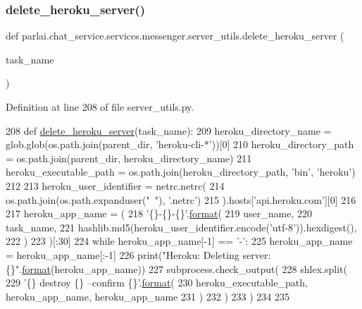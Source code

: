 \subsubsection{\texorpdfstring{delete\+\_\+heroku\+\_\+server()}{delete\_heroku\_server()}}
{\footnotesize\ttfamily def parlai.\+chat\+\_\+service.\+services.\+messenger.\+server\+\_\+utils.\+delete\+\_\+heroku\+\_\+server (\begin{DoxyParamCaption}\item[{}]{task\+\_\+name }\end{DoxyParamCaption})}



Definition at line 208 of file server\+\_\+utils.\+py.


\begin{DoxyCode}
208 \textcolor{keyword}{def }\hyperlink{namespaceparlai_1_1mturk_1_1core_1_1server__utils_a8dfde882f9d6ff492ca565ae2334fc70}{delete\_heroku\_server}(task\_name):
209     heroku\_directory\_name = glob.glob(os.path.join(parent\_dir, \textcolor{stringliteral}{'heroku-cli-*'}))[0]
210     heroku\_directory\_path = os.path.join(parent\_dir, heroku\_directory\_name)
211     heroku\_executable\_path = os.path.join(heroku\_directory\_path, \textcolor{stringliteral}{'bin'}, \textcolor{stringliteral}{'heroku'})
212 
213     heroku\_user\_identifier = netrc.netrc(
214         os.path.join(os.path.expanduser(\textcolor{stringliteral}{"~"}), \textcolor{stringliteral}{'.netrc'})
215     ).hosts[\textcolor{stringliteral}{'api.heroku.com'}][0]
216 
217     heroku\_app\_name = (
218         \textcolor{stringliteral}{'\{\}-\{\}-\{\}'}.\hyperlink{namespaceparlai_1_1chat__service_1_1services_1_1messenger_1_1shared__utils_a32e2e2022b824fbaf80c747160b52a76}{format}(
219             user\_name,
220             task\_name,
221             hashlib.md5(heroku\_user\_identifier.encode(\textcolor{stringliteral}{'utf-8'})).hexdigest(),
222         )
223     )[:30]
224     \textcolor{keywordflow}{while} heroku\_app\_name[-1] == \textcolor{stringliteral}{'-'}:
225         heroku\_app\_name = heroku\_app\_name[:-1]
226     print(\textcolor{stringliteral}{"Heroku: Deleting server: \{\}"}.\hyperlink{namespaceparlai_1_1chat__service_1_1services_1_1messenger_1_1shared__utils_a32e2e2022b824fbaf80c747160b52a76}{format}(heroku\_app\_name))
227     subprocess.check\_output(
228         shlex.split(
229             \textcolor{stringliteral}{'\{\} destroy \{\} --confirm \{\}'}.\hyperlink{namespaceparlai_1_1chat__service_1_1services_1_1messenger_1_1shared__utils_a32e2e2022b824fbaf80c747160b52a76}{format}(
230                 heroku\_executable\_path, heroku\_app\_name, heroku\_app\_name
231             )
232         )
233     )
234 
235 
\end{DoxyCode}
